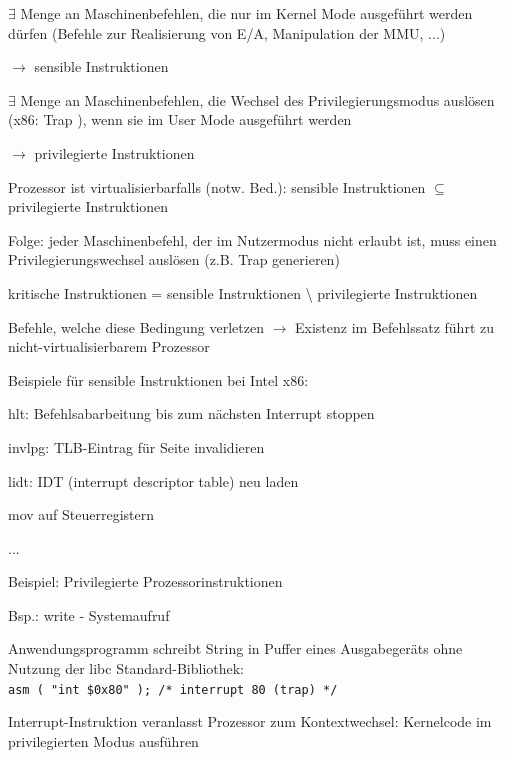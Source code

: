 \documentclass[a4paper]{article}
\begin{document}
\begin{multicols}{3}
    \begin{itemize*}
        \item
        $\exists$ Menge an Maschinenbefehlen, die nur im
        Kernel Mode ausgeführt werden dürfen (Befehle zur Realisierung von
        E/A, Manipulation der MMU, ...)
        \begin{itemize*}
            \item[$\rightarrow$] sensible Instruktionen
        \end{itemize*}
        \item
        $\exists$ Menge an Maschinenbefehlen, die Wechsel des
        Privilegierungsmodus auslösen (x86: Trap ), wenn sie im User Mode
        ausgeführt werden
        \begin{itemize*}
            \item[$\rightarrow$] privilegierte Instruktionen
        \end{itemize*}
        \item
        Prozessor ist virtualisierbarfalls (notw. Bed.): sensible
        Instruktionen $\subseteq$ privilegierte Instruktionen
        \item
        Folge: jeder Maschinenbefehl, der im Nutzermodus nicht erlaubt ist,
        muss einen Privilegierungswechsel auslösen (z.B. Trap generieren)
        \item
        kritische Instruktionen = sensible Instruktionen \textbackslash{}
        privilegierte Instruktionen
        \begin{itemize*}
            \item Befehle, welche diese Bedingung verletzen $\rightarrow$ Existenz im Befehlssatz führt zu nicht-virtualisierbarem Prozessor
        \end{itemize*}
        \item
        Beispiele für sensible Instruktionen bei Intel x86:
        \begin{itemize*}
            \item hlt: Befehlsabarbeitung bis zum nächsten Interrupt stoppen
            \item invlpg: TLB-Eintrag für Seite invalidieren
            \item lidt: IDT (interrupt descriptor table) neu laden
            \item mov auf Steuerregistern
            \item ...
        \end{itemize*}
        \item
        Beispiel: Privilegierte Prozessorinstruktionen
        \begin{itemize*}
            \item Bsp.: write - Systemaufruf
            \item Anwendungsprogramm schreibt String in Puffer eines Ausgabegeräts ohne Nutzung der libc Standard-Bibliothek: \texttt{asm\ (\ "int\ \$0x80"\ );\ /*\ interrupt\ 80\ (trap)\ */}
            \item Interrupt-Instruktion veranlasst Prozessor zum Kontextwechsel: Kernelcode im privilegierten Modus ausführen
        \end{itemize*}
    \end{itemize*}


\end{multicols}
\end{document}
